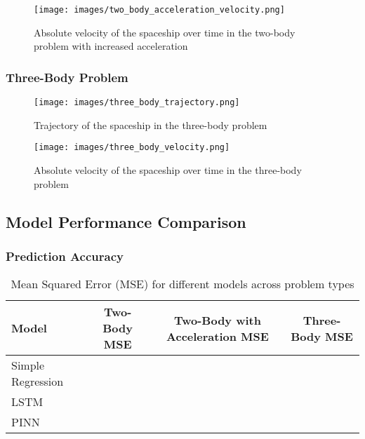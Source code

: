 \documentclass[12pt,a4paper]{article}
\begin{document}
\begin{figure}[h]
    \centering
    \texttt{[image: images/two\_body\_acceleration\_velocity.png]}
    \caption{Absolute velocity of the spaceship over time in the two-body problem with increased acceleration}
    \label{fig:two_body_acceleration_velocity}
\end{figure}

\subsubsection{Three-Body Problem}
\begin{figure}[h]
    \centering
    \texttt{[image: images/three\_body\_trajectory.png]}
    \caption{Trajectory of the spaceship in the three-body problem}
    \label{fig:three_body_trajectory}
\end{figure}

\begin{figure}[h]
    \centering
    \texttt{[image: images/three\_body\_velocity.png]}
    \caption{Absolute velocity of the spaceship over time in the three-body problem}
    \label{fig:three_body_velocity}
\end{figure}

\subsection{Model Performance Comparison}

\subsubsection{Prediction Accuracy}
\begin{table}[h]
    \centering
    \begin{tabular}{lccc}
        \hline
        Model & Two-Body MSE & Two-Body with Acceleration MSE & Three-Body MSE \\
        \hline
        Simple Regression & & & \\
        LSTM & & & \\
        PINN & & & \\
        \hline
    \end{tabular}
    \caption{Mean Squared Error (MSE) for different models across problem types}
    \label{tab:model_mse}
\end{table}
\end{document}
